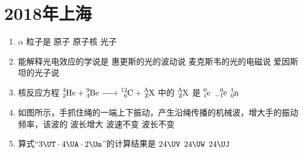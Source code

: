 \documentclass[\gkver]{gaokaozhenti}
\begin{document}
\chapter{2018年上海}

\begin{enumerate}
\item
$\alpha$ 粒子是
{原子}
{原子核}
{光子}

\item
能解释光电效应的学说是
{惠更斯的光的波动说}
{麦克斯韦的光的电磁说}
{爱因斯坦的光子说}

\item
核反应方程 $\ce{^{4}_{2}He + ^{9}_{4}Be -> ^{12}_{6}C + ^{A}_{Z}X}$ 中的 $\ce{^{A}_{Z}X}$ 是
{$\ce{^{0}_{1}e}$}
{$\ce{^{0}_{-1}e}$}
{$\ce{^{1}_{0}n}$}

\item
如图所示，手抓住绳的一端上下振动，产生沿绳传播的机械波，增大手的振动频率，该波的
{波长增大}
{波速不变}
{波长不变}

\item
算式“$3\UT\cdot4\UA\cdot2\Um$”的计算结果是
\fourchoices[answer=A]
{$24\UN$}
{$24\UV$}
{$24\UW$}
{$24\UJ$}


\end{enumerate}
\end{document}
